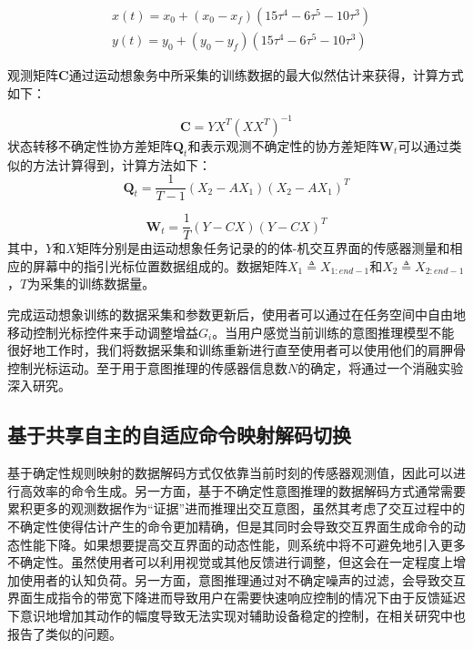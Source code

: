 \begin{equation}
    \begin{aligned}
    & x(t)=x_0+\left(x_0-x_f\right)\left(15 \tau^4-6 \tau^5-10 \tau^3\right) \\
    & y(t)=y_0+\left(y_0-y_f\right)\left(15 \tau^4-6 \tau^5-10 \tau^3\right)
    \end{aligned}
    \label{eq3-9}
\end{equation}

观测矩阵${\boldsymbol{C}}$通过运动想象务中所采集的训练数据的最大似然估计来获得，计算方式如下：

\begin{equation}
\boldsymbol{C} = YX^T(XX^T)^{-1}
\end{equation}
状态转移不确定性协方差矩阵${{\boldsymbol{Q}}_t}$和表示观测不确定性的协方差矩阵${{\boldsymbol{W}}_t}$可以通过类似的方法计算得到，计算方法如下：
\begin{equation}
{\boldsymbol{Q}}_t = \frac{1}{T-1}(X_2 - AX_1)(X_2 - AX_1)^T
\end{equation}

\begin{equation}
{\boldsymbol{W}}_t = \frac{1}{T}(Y - CX)(Y - CX)^T
\end{equation}
其中，$Y$和$X$矩阵分别是由运动想象任务记录的的体-机交互界面的传感器测量和相应的屏幕中的指引光标位置数据组成的。数据矩阵$X_1\triangleq X_{1:end-1}$和$X_2\triangleq X_{2:end-1}$，$T$为采集的训练数据量。

完成运动想象训练的数据采集和参数更新后，使用者可以通过在任务空间中自由地移动控制光标控件来手动调整增益${G_i}$。当用户感觉当前训练的意图推理模型不能很好地工作时，我们将数据采集和训练重新进行直至使用者可以使用他们的肩胛骨控制光标运动。至于用于意图推理的传感器信息数$N$的确定，将通过一个消融实验深入研究。  

\subsection{基于共享自主的自适应命令映射解码切换}  基于确定性规则映射的数据解码方式仅依靠当前时刻的传感器观测值，因此可以进行高效率的命令生成。另一方面，基于不确定性意图推理的数据解码方式通常需要累积更多的观测数据作为``证据''进而推理出交互意图，虽然其考虑了交互过程中的不确定性使得估计产生的命令更加精确，但是其同时会导致交互界面生成命令的动态性能下降。如果想要提高交互界面的动态性能，则系统中将不可避免地引入更多不确定性。虽然使用者可以利用视觉或其他反馈进行调整，但这会在一定程度上增加使用者的认知负荷。另一方面，意图推理通过对不确定噪声的过滤，会导致交互界面生成指令的带宽下降进而导致用户在需要快速响应控制的情况下由于反馈延迟下意识地增加其动作的幅度导致无法实现对辅助设备稳定的控制，在相关研究\cite{seanez-gonzalezStaticDynamicDecoding2017}中也报告了类似的问题。

